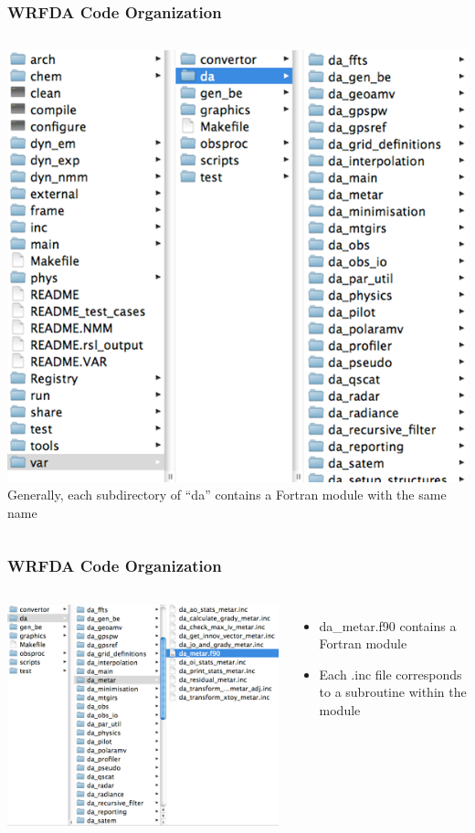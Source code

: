\documentclass{beamer}
\begin{document}
\begin{frame}
\frametitle{WRFDA Code Organization}
\begin{columns}[c]
\column{5cm}
\includegraphics[scale=0.4]{wrfdaCode2}
\column{3cm}
Generally, each subdirectory of “da” contains a Fortran module with the same name
\end{columns}
\end{frame}

\begin{frame}
\frametitle{WRFDA Code Organization}
\begin{columns}[c, totalwidth=12cm]
\column{6cm}
\includegraphics[scale=0.4]{wrfdaCode3}
\column{4.5cm}
\begin{itemize}
\item da\_metar.f90 contains a Fortran module
\item Each .inc file corresponds to a subroutine within the module
\end{itemize}
\end{columns}
\end{frame}
\end{document}
